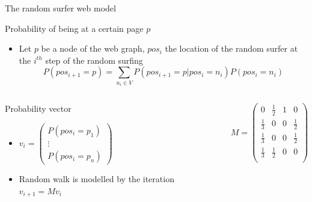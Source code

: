 \documentclass[10pt]{beamer}
\begin{document}
\begin{frame}{The random surfer web model}
\begin{block}{Probability of being at a certain page $p$}
\begin{itemize}
\item Let $p$ be a node of the web graph, $pos_i$ the location of the random surfer at the $i^{th}$ step of the random surfing
$$ P(pos_{i+1}=p) = \sum_{n_i\in V} P(pos_{i+1}=p|pos_{i}=n_i)  P(pos_i = n_i)$$
\end{itemize}
\end{block}
\begin{columns}
\centering
\begin{column}{0.5\paperwidth}
\begin{block}{Probability vector}
\begin{itemize}
\item $ v_i =
\begin{pmatrix}
P(pos_i = p_1) \\
\vdots \\
P(pos_i = p_n)
\end{pmatrix}
$
\item Random walk is modelled by the iteration $v_{i+1} = M v_i$
\end{itemize}

\end{block}
\end{column}
\begin{column}{0.4\paperwidth}
$$M = \begin{pmatrix}
0 & \frac{1}{2} & 1 & 0 \\
\frac{1}{3} & 0 & 0 & \frac{1}{2} \\
\frac{1}{3} & 0 & 0 & \frac{1}{2} \\
\frac{1}{3} & \frac{1}{2} & 0 & 0 \\
\end{pmatrix}$$
\end{column}
\end{columns}
\end{frame}
\end{document}

